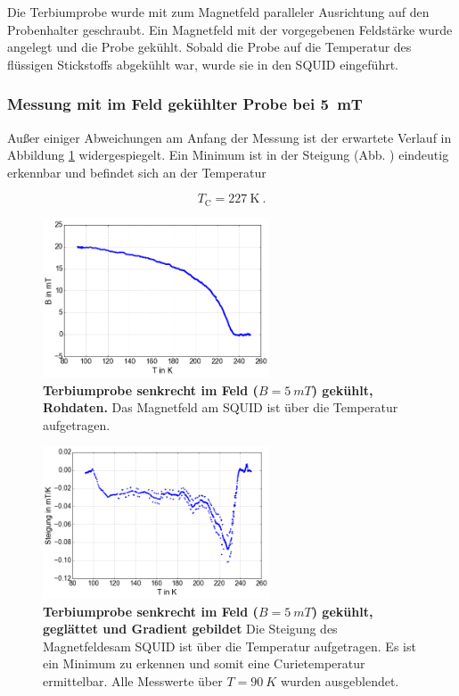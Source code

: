 \documentclass[a4paper,ngerman]{scrartcl}
\begin{document}
Die Terbiumprobe wurde mit zum Magnetfeld paralleler Ausrichtung auf den Probenhalter geschraubt. 
Ein Magnetfeld mit der vorgegebenen Feldstärke wurde angelegt und die Probe gekühlt.
Sobald die Probe auf die Temperatur des flüssigen Stickstoffs abgekühlt war,
wurde sie in den SQUID eingeführt.


\subsubsection*{Messung mit im Feld gekühlter Probe bei \SI{5}{mT}}

Außer einiger Abweichungen am Anfang der Messung ist der erwartete Verlauf in Abbildung \ref{fig:Tb_p_5} widergespiegelt.
Ein Minimum ist in der Steigung (Abb. ) eindeutig erkennbar und befindet sich an der Temperatur

\begin{equation}
T_{\mathrm{C}} = \SI{227}{\K} ~.
\end{equation}



\begin{figure}
\centering
\includegraphics[width=0.6\textwidth]{abbildungen/Tb_p_5.png}
\caption[Terbiumprobe parallel bei 5mT]{\textbf{Terbiumprobe senkrecht im Feld ($B = \SI{5}{mT}$) gekühlt, Rohdaten.} 
Das Magnetfeld am SQUID ist über die Temperatur aufgetragen. }
\label{fig:Tb_p_5}
\end{figure}

\begin{figure}
\centering
\includegraphics[width=0.6\textwidth]{abbildungen/Tb_p_5_grad.png}
\caption[Terbiumprobe parallel bei 5mT]{\textbf{Terbiumprobe senkrecht im Feld ($B = \SI{5}{mT}$) gekühlt, geglättet und Gradient gebildet} 
Die Steigung des Magnetfeldesam SQUID ist über die Temperatur aufgetragen. 
Es ist ein Minimum zu erkennen und somit eine Curietemperatur ermittelbar.
Alle Messwerte über $T =\SI{90}{K}$ wurden ausgeblendet.}
\label{fig:Tb_p_5_grad}
\end{figure}
\end{document}

